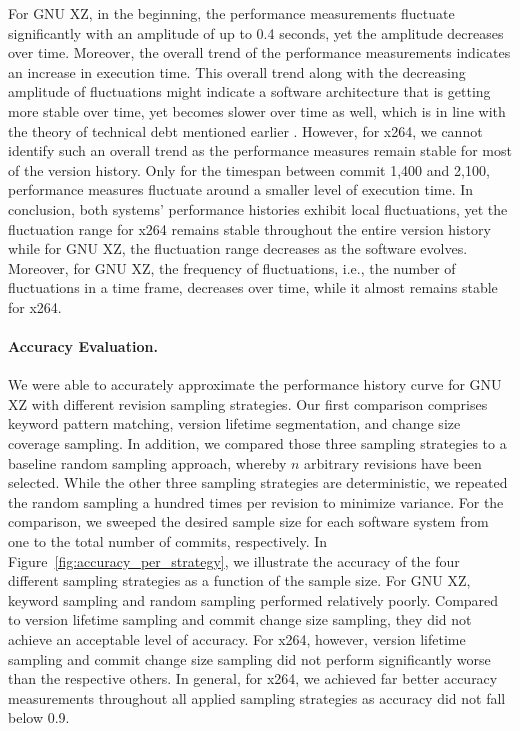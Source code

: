 For GNU XZ, in the beginning, the performance measurements fluctuate
significantly with an amplitude of up to 0.4 seconds, yet the amplitude
decreases over time. Moreover, the overall trend of the performance
measurements indicates an increase in execution time. This overall trend along
with the decreasing amplitude of fluctuations might indicate a software
architecture that is getting more stable over time, yet becomes slower over
time as well, which is in line with the theory of technical debt mentioned
earlier \citep{guo_tracking_2011}. However, for x264, we cannot identify such an
overall trend as the performance measures remain stable for most of the version
history. Only for the timespan between commit 1,400 and 2,100, performance
measures fluctuate around a smaller level of execution time. In conclusion,
both systems’ performance histories exhibit local fluctuations, yet the
fluctuation range for x264 remains stable throughout the entire version history
while for GNU XZ, the fluctuation range decreases as the software evolves.
Moreover, for GNU XZ, the frequency of fluctuations, i.e., the number of
fluctuations in a time frame, decreases over time, while it almost remains
stable for x264.

\paragraph{Accuracy Evaluation.} We were able to accurately approximate the
performance history curve for GNU XZ with different revision sampling
strategies. Our first comparison comprises keyword pattern matching, version
lifetime segmentation, and change size coverage sampling. In addition, we
compared those three sampling strategies to a baseline random sampling
approach, whereby $n$ arbitrary revisions have been selected. While the other
three sampling strategies are deterministic, we repeated the random sampling a
hundred times per revision to minimize variance. For the comparison, we sweeped
the desired sample size for each software system from one to the total number
of commits, respectively. In Figure~\ref{fig:accuracy_per_strategy}, we
illustrate the accuracy of the four different sampling strategies as a function
of the sample size. For GNU XZ, keyword sampling and random sampling performed
relatively poorly. Compared to version lifetime sampling and commit change size
sampling, they did not achieve an acceptable level of accuracy. For x264,
however, version lifetime sampling and commit change size sampling did not
perform significantly worse than the respective others. In general, for x264,
we achieved far better accuracy measurements throughout all applied sampling
strategies as accuracy did not fall below 0.9.

